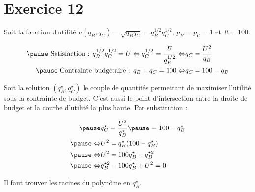 \documentclass[9pt,professionalfonts,handout,hyperref]{beamer}
\begin{document}
\section{Exercice 12}

%

\begin{frame}
	
Soit la fonction d'utilité $u(q_B, q_C) = \sqrt{q_Bq_C} = q_B^{1/2}q_C^{1/2}$, $p_B = p_C = 1$ et $R=100$. 

\[\begin{aligned}
\pause \text{ Satisfaction :   }q_B^{1/2}q_C^{1/2} = U \Leftrightarrow q_C^{1/2} = \frac{U}{q_B^{1/2}} \Leftrightarrow &q_C = \frac{U^2}{q_B} \\
\pause \text{ Contrainte budgétaire :   }q_B+q_C = 100 \Leftrightarrow &q_C = 100-q_B 
\end{aligned}\]

\bigskip 

\pause Soit la solution $(q_B^\star,q_C^\star)$ le couple de quantités permettant de maximiser l'utilité sous la contrainte de budget. \pause C'est aussi le point d'intersection entre la droite de budget et la courbe d'utilité la plus haute. \pause Par substitution : 

\[\begin{aligned}
\pause &q_C^\star = \frac{U^2}{q_B^\star} \pause = 100-q_B^\star\\
\pause \Leftrightarrow&  U^2 = q_B^\star(100-q_B^\star) \\
\pause \Leftrightarrow&  U^2 = 100q_B^\star -q_B^{\star 2} \\
\pause \Leftrightarrow&  q_B^{\star 2} -100q_B^\star + U^2 = 0\\
\end{aligned}\]

\pause Il faut trouver les racines du polynôme en $q_B^\star$.

\end{frame}
\end{document}
